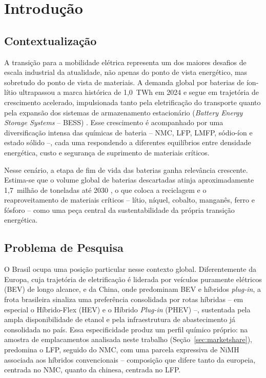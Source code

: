 \newpage
\section{Introdução}
\label{sec:introducao}

\subsection{Contextualização}
\label{subsec:contextualizacao}

A transição para a mobilidade elétrica representa um dos maiores desafios de
escala industrial da atualidade, não apenas do ponto de vista energético, mas
sobretudo do ponto de vista de materiais. A demanda global por baterias de
íon-lítio ultrapassou a marca histórica de 1,0~TWh em 2024 e segue em trajetória
de crescimento acelerado, impulsionada tanto pela eletrificação do transporte
quanto pela expansão dos sistemas de armazenamento estacionário
(\textit{Battery Energy Storage Systems} -- BESS) \cite{McKinsey2026, IEA2025}.
Esse crescimento é acompanhado por uma diversificação intensa das químicas de
bateria -- NMC, LFP, LMFP, sódio-íon e estado sólido --, cada uma respondendo a
diferentes equilíbrios entre densidade energética, custo e segurança de
suprimento de materiais críticos.

Nesse cenário, a etapa de fim de vida das baterias ganha relevância crescente.
Estima-se que o volume global de baterias descartadas atinja aproximadamente
1,7~milhão de toneladas até 2030 \cite{melin2022} , o que coloca a reciclagem e
o reaproveitamento de materiais críticos -- lítio, níquel, cobalto, manganês,
ferro e fósforo -- como uma peça central da sustentabilidade da própria
transição energética.

\subsection{Problema de Pesquisa}
\label{subsec:problema}

O Brasil ocupa uma posição particular nesse contexto global. Diferentemente da
Europa, cuja trajetória de eletrificação é liderada por veículos puramente
elétricos (BEV) de longo alcance, e da China, onde predominam BEV e híbridos
\textit{plug-in}, a frota brasileira sinaliza uma preferência consolidada por
rotas híbridas -- em especial o Híbrido-Flex (HEV) e o Híbrido \textit{Plug-in}
(PHEV) --, sustentada pela ampla disponibilidade de etanol e pela infraestrutura
de abastecimento já consolidada no país. Essa especificidade produz um perfil
químico próprio: na amostra de emplacamentos analisada neste trabalho
(Seção~\ref{sec:marketshare}), predomina o LFP, seguido do NMC, com uma parcela
expressiva de NiMH associada aos híbridos convencionais -- composição que difere
tanto da europeia, centrada no NMC, quanto da chinesa, centrada no LFP.


